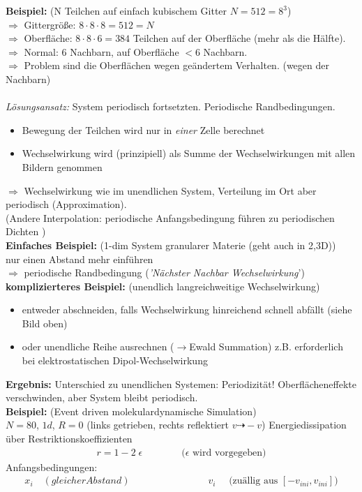 \documentclass[12pt]{article}
\begin{document}
\textbf{Beispiel:}  (N Teilchen auf einfach kubischem Gitter $N = 512 = 8^3$) \\
$\Rightarrow$ Gittergröße: $ 8 \cdot 8 \cdot 8 = 512=N$ \\
$\Rightarrow$ Oberfläche: $8 \cdot 8 \cdot 6 = 384$ Teilchen auf der Oberfläche (mehr als die Hälfte). \\
$\Rightarrow$ Normal: $6$ Nachbarn, auf Oberfläche $<6$ Nachbarn. \\
$\Rightarrow$ Problem sind die Oberflächen wegen geändertem Verhalten. (wegen der Nachbarn)\\ \\
 \textit{Lösungsansatz:} System periodisch fortsetzten. Periodische Randbedingungen. 
\begin{itemize}
\item Bewegung der Teilchen wird nur in \textit{einer} Zelle berechnet
\item Wechselwirkung wird (prinzipiell) als Summe der Wechselwirkungen mit allen Bildern genommen
\end{itemize}
$\Rightarrow$ Wechselwirkung wie im unendlichen System, Verteilung im Ort aber periodisch (Approximation). \\
(Andere Interpolation: periodische Anfangsbedingung führen zu periodischen Dichten %
) \\
\textbf{Einfaches Beispiel:} (1-dim System granularer Materie (geht auch in 2,3D)) \\ %
nur einen Abstand mehr einführen \\ $\Rightarrow$ periodische Randbedingung (\textit{'Nächster Nachbar Wechselwirkung}') \\
\textbf{komplizierteres Beispiel:} (unendlich langreichweitige Wechselwirkung)
\begin{itemize}
\item entweder abschneiden, falls Wechselwirkung hinreichend schnell abfällt (siehe Bild oben) %
\item oder unendliche Reihe ausrechnen ($\to$Ewald Summation) z.B. erforderlich bei elektrostatischen Dipol-Wechselwirkung 
\end{itemize}
\textbf{Ergebnis:} Unterschied zu unendlichen Systemen: Periodizität! Oberflächeneffekte verschwinden, aber System bleibt periodisch. \\
\textbf{Beispiel:} (Event driven molekulardynamische Simulation) \\
$N=80$, $1d$, $R=0$ (links getrieben, rechts reflektiert $v  \dashrightarrow -v$) %
Energiedissipation über Restriktionskoeffizienten 
\begin{align*}
r = 1-2 \; \epsilon \qquad \qquad (\epsilon \text{ wird vorgegeben)}
\end{align*}
Anfangsbedingungen: 
\begin{align*}
 x_i \quad (gleicher Abstand) \qquad \qquad \qquad \qquad v_i \quad \text{ (zuällig aus } [-v_{ini} , v_{ini}]) 
\end{align*} %
\end{document}
